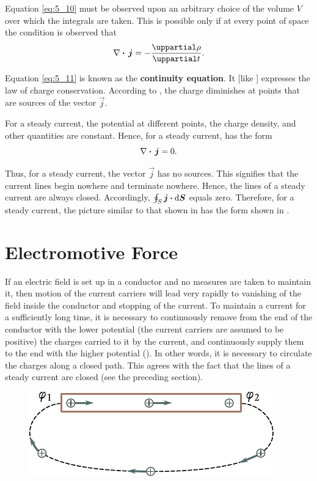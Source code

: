 \noindent
Equation \eqref{eq:5_10} must be observed upon an arbitrary choice of the volume $V$ over which the integrals are taken. This is possible only if at every point of space the condition is observed that
\begin{equation}\label{eq:5_11}
    \divop{\vec{j}} = - \diffpartial{\rho}{t}.
\end{equation}

\noindent
Equation \eqref{eq:5_11} is known as the \textbf{continuity equation}. It [like ] expresses the law of charge conservation. According to , the charge diminishes at points that are sources of the vector $\vec{j}$.

For a steady current, the potential at different points, the charge density, and other quantities are constant. Hence, for a steady current,  has the form
\begin{equation}\label{eq:5_12}
    \nabla\boldsymbol{\cdot}\,\boldsymbol{j} = 0.
\end{equation}

\noindent
Thus, for a steady current, the vector $\vec{j}$ has no sources. This signifies that the current lines begin nowhere and terminate nowhere. Hence, the lines of a steady current are always closed. Accordingly, $\oint_S\boldsymbol{j}\boldsymbol{\cdot}\mathrm{d}\boldsymbol{S}$ equals zero. Therefore, for a steady current, the picture similar to that shown in  has the form shown in .

\section{Electromotive Force}\label{sec:5_3}

If an electric field is set up in a conductor and no measures are taken to maintain it, then motion of the current carriers will lead very rapidly to vanishing of the field inside the conductor and stopping of the current. To maintain a current for a sufficiently long time, it is necessary to continuously remove from the end of the conductor with the lower potential (the current carriers are assumed to be positive) the charges carried to it by the current, and continuously supply them to the end with the higher potential (). In other words, it is necessary to circulate the charges along a closed path. This agrees with the fact that the lines of a steady current are closed (see the preceding section).

\begin{figure}[t]
	\begin{center}
		\includegraphics[scale=1]{figures/ch_05/fig_5_3.pdf}
		\caption[]{}
		\label{fig:5_3}
	\end{center}
	\vspace{-0.8cm}
\end{figure}

